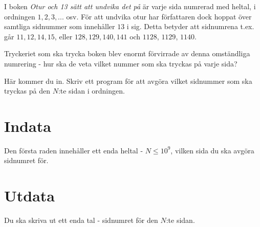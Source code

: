 I boken \emph{Otur och 13 sätt att undvika det på} är varje sida numrerad med heltal, i ordningen $1, 2, 3, ...$ osv. För att undvika otur har författaren dock
hoppat över samtliga sidnummer som innehåller $13$ i sig. Detta betyder att sidnumrena t.ex. går $11, 12, 14, 15$, eller $128, 129, 140, 141$ och $1128$, $1129$, $1140$.

Tryckeriet som ska trycka boken blev enormt förvirrade av denna omständliga numrering - hur ska de veta vilket nummer som ska tryckas på varje sida?

Här kommer du in. Skriv ett program för att avgöra vilket sidnummer som ska tryckas på den $N$:te sidan i ordningen.

\section*{Indata}
Den första raden innehåller ett enda heltal - $N \le 10^9$, vilken sida du ska avgöra sidnumret för.

\section*{Utdata}
Du ska skriva ut ett enda tal - sidnumret för den $N$:te sidan.
